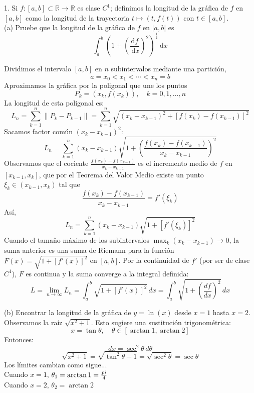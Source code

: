 \documentclass{article}
\theoremstyle{nonumberplain}
\begin{document}
1. Si \( f:[a, b] \subset \mathbb{R} \rightarrow \mathbb{R} \) es clase \( C^{1} \); definimos la longitud de la gráfica de \( f \) en \( [a, b] \) como la longitud de la trayectoria \( t \mapsto(t, f(t)) \) con \( t \in[a, b] \). \\
(a) Pruebe que la longitud de la gráfica de \( f \) en \( |a, b| \) es
\[
\int_{a}^{b}\left(1+\left(\frac{\mathrm{d} f}{\mathrm{~d} x}\right)^{2}\right)^{\frac{1}{2}} \mathrm{~d} x
\]


Dividimos el intervalo \([a, b]\) en \( n \) subintervalos mediante una partición,
\[
a = x_0 < x_1 < \cdots < x_n = b
\]
Aproximamos la gráfica por la poligonal que une los puntos
\[
P_k = (x_k, f(x_k)), \quad k = 0, 1, \ldots, n
\]
La longitud de esta poligonal es:
\[
L_n = \sum_{k=1}^n \left\| P_k - P_{k-1} \right\| = \sum_{k=1}^n \sqrt{(x_k - x_{k-1})^2 + [f(x_k) - f(x_{k-1})]^2}
\]
Sacamos factor común \((x_k - x_{k-1})^2\):
\[
L_n = \sum_{k=1}^n (x_k - x_{k-1}) \sqrt{1 + \left( \frac{f(x_k) - f(x_{k-1})}{x_k - x_{k-1}} \right)^2 }
\]
Observamos que el cociente \(\frac{f(x_k) - f(x_{k-1})}{x_k - x_{k-1}}\) es el incremento medio de \(f\) en \([x_{k-1}, x_k]\), que por el Teorema del Valor Medio existe un punto \( \xi_k \in (x_{k-1}, x_k) \) tal que
\[
\frac{f(x_k) - f(x_{k-1})}{x_k - x_{k-1}} = f'(\xi_k)
\]
Así,
\[
L_n = \sum_{k=1}^n (x_k - x_{k-1}) \sqrt{1 + [f'(\xi_k)]^2 }
\]
Cuando el tamaño máximo de los subintervalos \( \max_k (x_k - x_{k-1}) \to 0 \), la suma anterior es una suma de Riemann para la función \( F(x) = \sqrt{1 + [f'(x)]^2} \) en \([a, b]\). Por la continuidad de \(f'\) (por ser de clase \(C^1\)), \(F\) es continua y la suma converge a la integral definida:
\[
L = \lim_{n \to \infty} L_n = \int_a^b \sqrt{1 + [f'(x)]^2} \, dx = \int_a^b \sqrt{1 + \left(\frac{df}{dx}\right)^2} \, dx
\]


(b) Encontrar la longitud de la gráfica de \( y=\ln (x) \) desde \( x=1 \) hasta \( x=2 \). \\

Observamos la raíz \(\sqrt{x^2 + 1}\). Esto sugiere una sustitución trigonométrica:
\[
x = \tan\theta, \quad \theta \in \left[ \arctan 1, \arctan 2 \right]
\]
Entonces:
\[
dx = \sec^2\theta\, d\theta
\]
\[
\sqrt{x^2 + 1} = \sqrt{\tan^2\theta + 1} = \sqrt{\sec^2\theta} = \sec\theta
\]
Los límites cambian como sigue...\\

Cuando \(x=1\), \(\theta_1 = \arctan 1 = \frac{\\pi}{4}\)\\
Cuando \(x=2\), \(\theta_2 = \arctan 2\)\\
\end{document}
